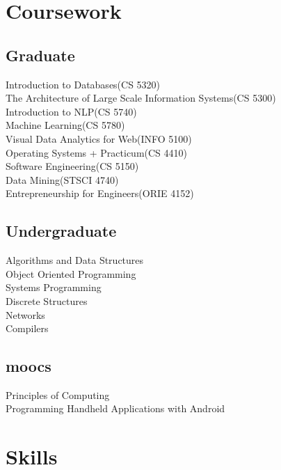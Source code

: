 \documentclass[]{deedy-resume-openfont}
\begin{document}
\begin{minipage}[t]{0.33\textwidth}

\section{Coursework}
\subsection{Graduate}
Introduction to Databases(CS 5320)\\
The Architecture of Large Scale Information Systems(CS 5300)\\
Introduction to NLP(CS 5740)\\
Machine Learning(CS 5780)\\
Visual Data Analytics for Web(INFO 5100)\\
Operating Systems + Practicum(CS 4410)\\
Software Engineering(CS 5150)\\
Data Mining(STSCI 4740)\\
Entrepreneurship for Engineers(ORIE 4152)\\

\sectionsep

\subsection{Undergraduate}
Algorithms and Data Structures\\
Object Oriented Programming\\
Systems Programming \\
Discrete Structures\\
Networks\\
Compilers\\

\sectionsep

\subsection{moocs}
Principles of Computing\\
Programming Handheld Applications with Android\\




\section{Skills}

\end{minipage}
\end{document}

